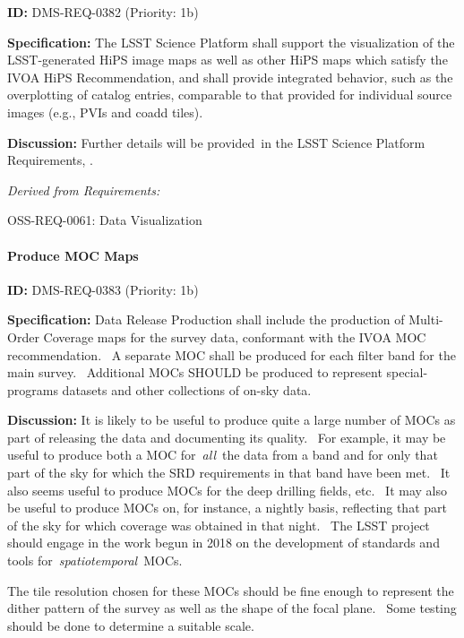 \documentclass[SE,toc,lsstdraft]{lsstdoc}
\begin{document}
\label{DMS-REQ-0382}
\textbf{ID:} DMS-REQ-0382 (Priority: 1b)

\textbf{Specification:}
The LSST Science Platform shall support the visualization of the LSST-generated HiPS image maps as well as other HiPS maps which satisfy the IVOA HiPS Recommendation, and shall provide integrated behavior, such as the overplotting of catalog entries, comparable to that provided for individual source images (e.g., PVIs and coadd tiles).

\textbf{Discussion:}
Further details will be provided in the LSST Science Platform Requirements, .

\emph{Derived from Requirements:}

OSS-REQ-0061:
Data Visualization \newline

\paragraph{Produce MOC Maps}\hfill  %

\label{DMS-REQ-0383}
\textbf{ID:} DMS-REQ-0383 (Priority: 1b)

\textbf{Specification:}
Data Release Production shall include the production of Multi-Order Coverage maps for the survey data, conformant with the IVOA MOC recommendation.  A separate MOC shall be produced for each filter band for the main survey.  Additional MOCs SHOULD be produced to represent special-programs datasets and other collections of on-sky data.

\textbf{Discussion:}
It is likely to be useful to produce quite a large number of MOCs as part of releasing the data and documenting its quality.  For example, it may be useful to produce both a MOC for \emph{all} the data from a band and for only that part of the sky for which the SRD requirements in that band have been met.  It also seems useful to produce MOCs for the deep drilling fields, etc.  It may also be useful to produce MOCs on, for instance, a nightly basis, reflecting that part of the sky for which coverage was obtained in that night.  The LSST project should engage in the work begun in 2018 on the development of standards and tools for \emph{spatiotemporal} MOCs.

The tile resolution chosen for these MOCs should be fine enough to represent the dither pattern of the survey as well as the shape of the focal plane.  Some testing should be done to determine a suitable scale.
\end{document}
